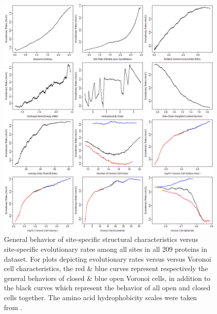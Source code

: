 \documentclass[11pt]{article}
\begin{document}
    \begin{figure}[tbh]
        \begin{center}
        \includegraphics[width=6.9in]{adjacent_averaging_screen/voro_log/zr4s_JC.png}
        \end{center}
        \caption{General behavior of site-specific structural characteristics versus site-specific evolutionary rates among all sites in all 209 proteins in dataset. For plots depicting evolutionary rates versus versus Voronoi cell characteristics, the red \& blue curves represent respectively the general behaviors of closed \& blue open Voronoi cells, in addition to the black curves which represent the behavior of all open and closed cells together. The amino acid hydrophobicity scales were taken from \citet{hessa_recognition_2005}.}
        \label{fig:adjavg_ER}
    \end{figure}
\end{document}
